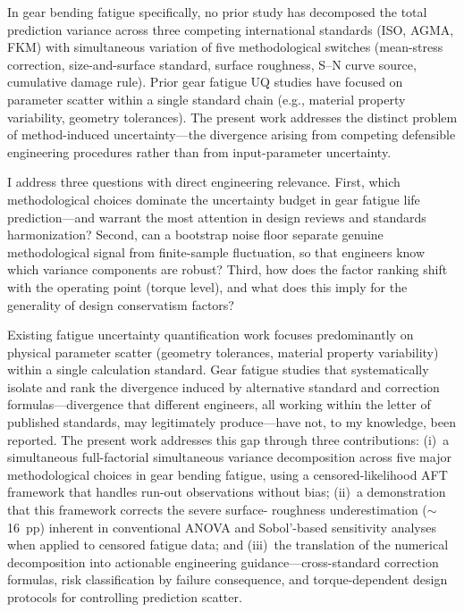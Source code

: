 \documentclass[twocolumn,12pt,a4paper]{article}
\begin{document}
In gear bending fatigue specifically, no prior study has decomposed the
total prediction variance across three competing international
standards (ISO, AGMA, FKM) with simultaneous variation of five
methodological switches (mean-stress correction, size-and-surface
standard, surface roughness, S--N curve source, cumulative damage
rule). Prior gear fatigue UQ studies have focused on parameter scatter
within a single standard chain (e.g., material property variability,
geometry tolerances). The present work addresses the distinct problem
of method-induced uncertainty---the divergence arising from competing
defensible engineering procedures rather than from input-parameter
uncertainty.

I address three questions with direct engineering relevance. First,
which methodological choices dominate the uncertainty budget in gear
fatigue life prediction---and warrant the most attention in
design reviews and standards harmonization? Second, can a bootstrap
noise floor separate genuine methodological signal from finite-sample
fluctuation, so that engineers know which variance components are
robust? Third, how does the factor ranking shift with the operating
point (torque level), and what does this imply for the generality of
design conservatism factors?

Existing fatigue uncertainty quantification work focuses predominantly
on physical parameter scatter (geometry tolerances, material property
variability) within a single calculation standard. Gear fatigue studies
that systematically isolate and rank the divergence induced by
alternative standard and correction formulas---divergence that different
engineers, all working within the letter of published standards, may
legitimately produce---have not, to my knowledge, been reported. The
present work addresses this gap through three contributions: (i)~a simultaneous
full-factorial
simultaneous variance decomposition across five major methodological
choices in gear bending fatigue, using a censored-likelihood AFT
framework that handles run-out observations without bias;
(ii)~a demonstration that this framework corrects the severe surface-
roughness underestimation ($\sim$16~pp) inherent in conventional
ANOVA and Sobol'-based sensitivity analyses when applied to censored
fatigue data; and (iii)~the translation of the numerical
decomposition into actionable engineering guidance---cross-standard
correction formulas, risk classification by failure consequence,
and torque-dependent design protocols for controlling prediction
scatter.
\end{document}
